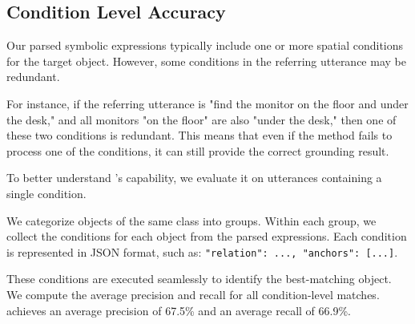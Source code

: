 \subsection{Condition Level Accuracy}


Our parsed symbolic expressions typically include one or more spatial conditions for the target object. However, some conditions in the referring utterance may be redundant.

For instance, if the referring utterance is "find the monitor on the floor and under the desk," and all monitors "on the floor" are also "under the desk," then one of these two conditions is redundant. This means that even if the method fails to process one of the conditions, it can still provide the correct grounding result.

To better understand \ourmethod's capability, we evaluate it on utterances containing a single condition.

We categorize objects of the same class into groups. Within each group, we collect the conditions for each object from the parsed expressions. Each condition is represented in JSON format, such as:
\texttt{{"relation": ..., "anchors": [...]}}.

These conditions are executed seamlessly to identify the best-matching object. We compute the average precision and recall for all condition-level matches. \ourmethod achieves an average precision of 67.5\% and an average recall of 66.9\%.

